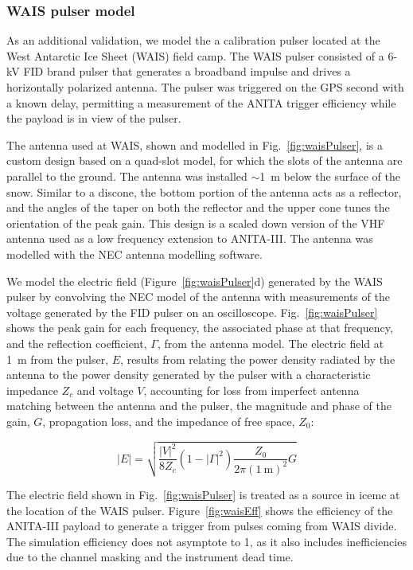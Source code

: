 \subsubsection{WAIS pulser model}
\label{subsec:wais}

As an additional validation, we model the a calibration pulser located at the West Antarctic Ice Sheet (WAIS) field camp. The WAIS pulser consisted of a 6-kV FID brand pulser that generates a broadband impulse and drives a horizontally polarized antenna. The pulser was triggered on the GPS second with a known delay, permitting a measurement of the  ANITA trigger efficiency while the payload is in view of the pulser.

The antenna used at WAIS, shown and modelled in Fig.~\ref{fig:waisPulser}, is a custom design based on a quad-slot model, for which the slots of the antenna are parallel to the ground. The antenna was installed $\sim$1~m below the surface of the snow. Similar to a discone, the bottom portion of the antenna acts as a reflector, and the angles of the taper on both the reflector and the upper cone tunes the orientation of the peak gain. This design is a scaled down version of the VHF antenna used as a low frequency extension to ANITA-III. The antenna was modelled with the NEC antenna modelling software.

We model the electric field (Figure~\ref{fig:waisPulser}d) generated by the WAIS pulser by convolving the NEC model of the antenna with measurements of the voltage generated by the FID pulser on an oscilloscope.  Fig.~\ref{fig:waisPulser} shows the peak gain for each frequency, the associated phase at that frequency, and the reflection coefficient, $\Gamma$, from the antenna model. The electric field at 1~m from the pulser, $E$, results from relating the power density radiated by the antenna to the power density generated by the pulser with a characteristic impedance $Z_{c}$ and voltage $V$, accounting for loss from imperfect antenna matching between the antenna and the pulser, the magnitude and phase of the gain, $G$, propagation loss, and the impedance of free space, $Z_0$:

\begin{equation}
|E| = \sqrt{\frac{|V|^2}{8 Z_c} (1 -|\Gamma|^2 ) \frac{Z_0}{2\pi (1~\textrm{m})^2} G}
\end{equation}

The electric field shown in Fig.~\ref{fig:waisPulser} is treated as a source in icemc at the location of the WAIS pulser. Figure~\ref{fig:waisEff} shows the efficiency of the ANITA-III payload to generate a trigger from pulses coming from WAIS divide. The simulation efficiency does not asymptote to 1, as it also includes inefficiencies due to the channel masking and the instrument dead time. 

